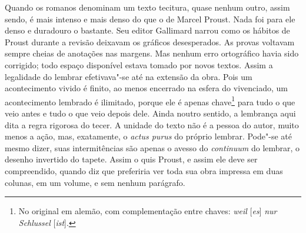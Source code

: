 Quando os romanos denominam um texto tecitura, quase nenhum outro, assim
sendo, é mais intenso e mais denso do que o de Marcel Proust. Nada foi
para ele denso e duradouro o bastante. Seu editor Gallimard narrou como
os hábitos de Proust durante a revisão deixavam os gráficos
desesperados. As provas voltavam sempre cheias de anotações nas margens.
Mas nenhum erro ortográfico havia sido corrigido; todo espaço disponível
estava tomado por novos textos. Assim a legalidade do lembrar
efetivava"-se até na extensão da obra. Pois um acontecimento vivido é
finito, ao menos encerrado na esfera do vivenciado, um acontecimento
lembrado é ilimitado, porque ele é apenas chave\footnote{No
  original em alemão, com complementação entre chaves: \emph{weil} {[}\emph{es}{]} \emph{nur Schlussel} {[}\emph{ist}{]}. \versal{[N. T.]}} para tudo o que veio antes e tudo o que veio
depois dele. Ainda noutro sentido, a lembrança aqui dita a regra
rigorosa do tecer. A unidade do texto não é a pessoa do autor, muito
menos a ação, mas, exatamente, o \emph{actus purus} do próprio lembrar.
Pode"-se até mesmo dizer, suas intermitências são apenas o avesso
do \emph{continuum} do lembrar, o desenho invertido do tapete. Assim o
quis Proust, e assim ele deve ser compreendido, quando diz que
preferiria ver toda sua obra impressa em duas colunas, em um volume, e
sem nenhum parágrafo.

